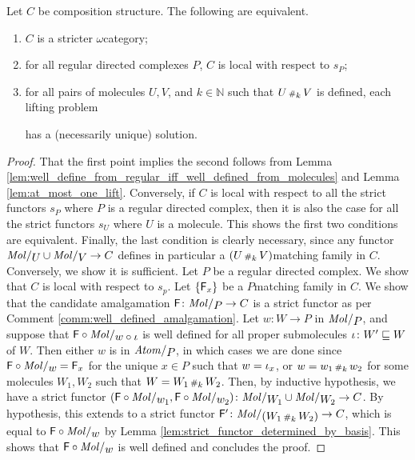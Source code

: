\begin{lem} \label{lem:stricter_iff_local_wrt_pasting}
    Let \( C \) be composition structure.
    The following are equivalent.
    \begin{enumerate}
        \item \( C \) is a stricter \( \omega \)\nbd category;
        \item for all regular directed complexes \( P \), \( C \) is local with respect to \( s_P \);
        \item for all pairs of molecules \( U, V \), and \( k \in \mathbb{N} \) such that \( U \,{\scriptstyle\#}_{k}\, V \) is defined, each lifting problem
        \begin{center}
        \end{center}
        has a (necessarily unique) solution.
    \end{enumerate}
\end{lem}
\begin{proof}
    That the first point implies the second follows from Lemma \ref{lem:well_define_from_regular_iff_well_defined_from_molecules} and Lemma \ref{lem:at_most_one_lift}.
    Conversely, if \( C \) is local with respect to all the strict functors \( s_P \) where \( P \) is a regular directed complex, then it is also the case for all the strict functors \( s_U \) where \( U \) is a molecule.
    This shows the first two conditions are equivalent.
    Finally, the last condition is clearly necessary, since any functor \( \molecin{U} \cup \molecin{V} \to C \) defines in particular a \( (U \,{\scriptstyle\#}_{k}\, V) \)\nbd matching family in \( C \).
    Conversely, we show it is sufficient.
    Let \( P \) be a regular directed complex.
    We show that \( C \) is local with respect to \( s_p \).
    Let \( \left\{ {\mathsf{F}_x} \right\} \) be a \( P \)\nbd matching family in \( C \).
    We show that the candidate amalgamation \( \F \colon \molecin{P} \to C \) is a strict functor as per Comment \ref{comm:well_defined_amalgamation}.
    Let \( w \colon W \to P \) in \( \molecin{P} \), and suppose that \( \F \after \molecin{w \after \iota} \) is well defined for all proper submolecules \( \iota \colon W' \sqsubseteq W \) of \( W \).
    Then either \( w \) is in \( \atomin{P} \), in which cases we are done since \( \F \after \molecin{w} = \F_x \) for the unique \( x \in P \) such that \( w = \iota_{x} \), or \( w = w_1 \,{\scriptstyle\#}_{k}\, w_2 \) for some molecules \( W_1, W_2 \) such that \( W = W_1 \,{\scriptstyle\#}_{k}\, W_2 \).
    Then, by inductive hypothesis, we have a strict functor \( (\F \after \molecin{w_1}, \F \after \molecin{w_2}) \colon \molecin{W_1} \cup \molecin{W_2} \to C \).
    By hypothesis, this extends to a strict functor \( \F' \colon \molecin{(W_1 \cp{k} W_2)} \to C \), which is equal to \( \F \after \molecin{w} \) by Lemma \ref{lem:strict_functor_determined_by_basis}.
    This shows that \( \F \after \molecin{w} \) is well defined and concludes the proof.
\end{proof}

